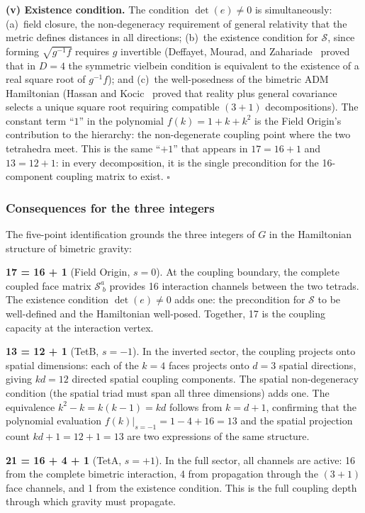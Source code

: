 \documentclass[aps,prd,preprint,superscriptaddress,showpacs,preprintnumbers,amsmath,amssymb,nofootinbib]{revtex4-2}
\begin{document}
\textbf{(v) Existence condition.} The condition $\det(e) \neq 0$ is simultaneously: (a)~field closure, the non-degeneracy requirement of general relativity that the metric defines distances in all directions; (b)~the existence condition for $\mathcal{S}$, since forming $\sqrt{g^{-1}f}$ requires $g$ invertible (Deffayet, Mourad, and Zahariade~\cite{deffayet2013} proved that in $D = 4$ the symmetric vielbein condition is equivalent to the existence of a real square root of $g^{-1}f$); and (c)~the well-posedness of the bimetric ADM Hamiltonian (Hassan and Kocic~\cite{hassankocic2018} proved that reality plus general covariance selects a unique square root requiring compatible $(3{+}1)$ decompositions). The constant term ``$1$'' in the polynomial $f(k) = 1 + k + k^2$ is the Field Origin's contribution to the hierarchy: the non-degenerate coupling point where the two tetrahedra meet. This is the same ``$+1$'' that appears in $17 = 16 + 1$ and $13 = 12 + 1$: in every decomposition, it is the single precondition for the 16-component coupling matrix to exist. \hfill$\square$

\subsubsection*{Consequences for the three integers}

The five-point identification grounds the three integers of $G$ in the Hamiltonian structure of bimetric gravity:

\textbf{17 = 16 + 1} (Field Origin, $s = 0$). At the coupling boundary, the complete coupled face matrix $\mathcal{S}^a_{\;b}$ provides 16 interaction channels between the two tetrads. The existence condition $\det(e) \neq 0$ adds one: the precondition for $\mathcal{S}$ to be well-defined and the Hamiltonian well-posed. Together, 17 is the coupling capacity at the interaction vertex.

\textbf{13 = 12 + 1} (TetB, $s = -1$). In the inverted sector, the coupling projects onto spatial dimensions: each of the $k = 4$ faces projects onto $d = 3$ spatial directions, giving $kd = 12$ directed spatial coupling components. The spatial non-degeneracy condition (the spatial triad must span all three dimensions) adds one. The equivalence $k^2 - k = k(k-1) = kd$ follows from $k = d + 1$, confirming that the polynomial evaluation $f(k)|_{s=-1} = 1 - 4 + 16 = 13$ and the spatial projection count $kd + 1 = 12 + 1 = 13$ are two expressions of the same structure.

\textbf{21 = 16 + 4 + 1} (TetA, $s = +1$). In the full sector, all channels are active: 16 from the complete bimetric interaction, 4 from propagation through the $(3{+}1)$ face channels, and 1 from the existence condition. This is the full coupling depth through which gravity must propagate.
\end{document}
